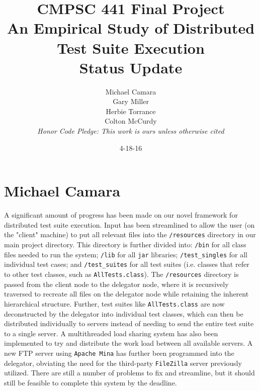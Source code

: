 \documentclass[11pt]{article}
\begin{document}
\title{CMPSC 441 Final Project\\An Empirical Study of Distributed Test Suite Execution\\Status Update}
\author{Michael Camara\\Gary Miller\\Herbie Torrance\\Colton McCurdy\\\textit{Honor Code Pledge: This work is ours unless otherwise cited}}
\date{4-18-16}
\maketitle

\section{Michael Camara}
A significant amount of progress has been made on our novel framework for distributed test suite execution.  Input has been streamlined to allow the user (on the "client" machine) to put all relevant files into the \texttt{/resources} directory in our main project directory.  This directory is further divided into: \texttt{/bin} for all class files needed to run the system; \texttt{/lib} for all \texttt{jar} libraries; \texttt{/test\_singles} for all individual test cases; and \texttt{/test\_suites} for all test suites (i.e. classes that refer to other test classes, such as \texttt{AllTests.class}).  The \texttt{/resources} directory is passed from the client node to the delegator node, where it is recursively traversed to recreate all files on the delegator node while retaining the inherent hierarchical structure.  Further, test suites like \texttt{AllTests.class} are now deconstructed by the delegator into individual test classes, which can then be distributed individually to servers instead of needing to send the entire test suite to a single server.  A multithreaded load sharing system has also been implemented to try and distribute the work load between all available servers.  A new FTP server using \texttt{Apache Mina} has further been programmed into the delegator, obviating the need for the third-party \texttt{FileZilla} server previously utilized.  There are still a number of problems to fix and streamline, but it should still be feasible to complete this system by the deadline.
\end{document}
